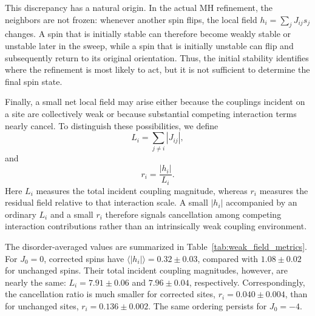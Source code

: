 \documentclass[
reprint,
amsmath,amssymb,
aps,
pre,
floatfix,
]{revtex4-2}
\begin{document}
This discrepancy has a natural origin. In the actual MH refinement, the
neighbors are not frozen: whenever another spin flips, the local field
$h_i=\sum_jJ_{ij}s_j$ changes. A spin that is initially stable can therefore
become weakly stable or unstable later in the sweep, while a spin that is
initially unstable can flip and subsequently return to its original
orientation. Thus, the initial stability identifies where the refinement is
most likely to act, but it is not sufficient to determine the final spin
state.

Finally, a small net local field may arise either because the couplings
incident on a site are collectively weak or because substantial competing
interaction terms nearly cancel. To distinguish these possibilities, we
define
\begin{equation}
    L_i
    =
    \sum_{j\neq i}|J_{ij}|,
    \label{eq:incident_strength}
\end{equation}
and
\begin{equation}
    r_i
    =
    \frac{|h_i|}{L_i}.
    \label{eq:cancellation_ratio}
\end{equation}
Here $L_i$ measures the total incident coupling magnitude, whereas $r_i$
measures the residual field relative to that interaction scale. A small
$|h_i|$ accompanied by an ordinary $L_i$ and a small $r_i$ therefore
signals cancellation among competing interaction contributions rather
than an intrinsically weak coupling environment.

The disorder-averaged values are summarized in
Table~\ref{tab:weak_field_metrics}. For $J_0=0$, corrected spins have
$\langle |h_i|\rangle=0.32\pm0.03$, compared with
$1.08\pm0.02$ for unchanged spins. Their total incident coupling
magnitudes, however, are nearly the same:
$L_i=7.91\pm0.06$ and $7.96\pm0.04$, respectively.
Correspondingly, the cancellation ratio is much smaller for corrected
sites,
$r_i=0.040\pm0.004$, than for unchanged sites,
$r_i=0.136\pm0.002$.
The same ordering persists for $J_0=-4$.
\end{document}
